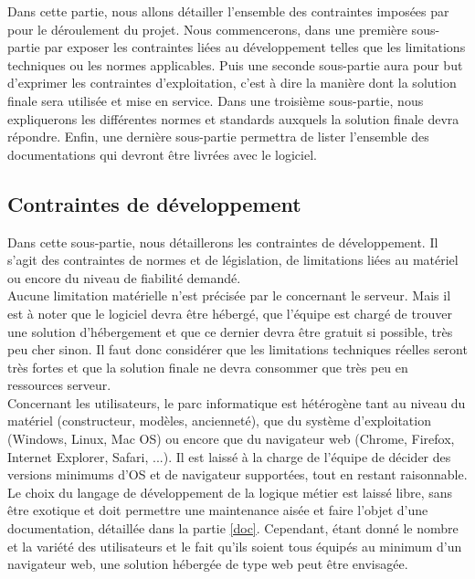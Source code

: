 Dans cette partie, nous allons détailler l'ensemble des contraintes imposées par \nomClient{} pour le déroulement du projet. Nous commencerons, dans une première sous-partie par exposer les contraintes liées au développement telles que les limitations techniques ou les normes applicables. Puis une seconde sous-partie aura pour but d'exprimer les contraintes d'exploitation, c'est à dire la manière dont la solution finale sera utilisée et mise en service. Dans une troisième sous-partie, nous expliquerons les différentes normes et standards auxquels la solution finale devra répondre. Enfin, une dernière sous-partie permettra de lister l'ensemble des documentations qui devront être livrées avec le logiciel.


\subsection{Contraintes de développement}
Dans cette sous-partie, nous détaillerons les contraintes de développement. Il s'agit des contraintes de normes et de législation, de limitations liées au matériel ou encore du niveau de fiabilité demandé.\\


Aucune limitation matérielle n'est précisée par le \client{} concernant le serveur. Mais il est à noter que le logiciel devra être hébergé, que l'équipe \PICCourt{} est chargé de trouver une solution d'hébergement et que ce dernier devra être gratuit si possible, très peu cher sinon. Il faut donc considérer que les limitations techniques réelles seront très fortes et que la solution finale ne devra consommer que très peu en ressources serveur.\\

Concernant les utilisateurs, le parc informatique est hétérogène tant au niveau du matériel (constructeur, modèles, ancienneté), que du système d'exploitation (Windows, Linux, Mac OS) ou encore que du navigateur web (Chrome, Firefox, Internet Explorer, Safari, ...). Il est laissé à la charge de l'équipe \PICCourt{} de décider des versions minimums d'OS et de navigateur supportées, tout en restant raisonnable.\\


Le choix du langage de développement de la logique métier est laissé libre, sans être exotique et doit permettre une maintenance aisée et faire l'objet d'une documentation, détaillée dans la partie \ref{doc}. Cependant, étant donné le nombre et la variété des utilisateurs et le fait qu'ils soient tous équipés au minimum d'un navigateur web, une solution hébergée de type web peut être envisagée.\\

